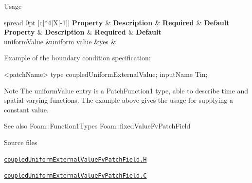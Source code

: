 \label{_Description}%
 \begin{DoxyParagraph}{Usage}
\tabulinesep=1mm
\begin{longtabu} spread 0pt [c]{*{4}{|X[-1]}|}
\hline
\rowcolor{\tableheadbgcolor}\PBS\centering \textbf{ {\bfseries  Property } }&\PBS\centering \textbf{ {\bfseries  Description } }&\PBS\centering \textbf{ {\bfseries  Required } }&\PBS\centering \textbf{ {\bfseries  Default}  }\\
\endfirsthead
\hline
\endfoot
\hline
\rowcolor{\tableheadbgcolor}\PBS\centering \textbf{ {\bfseries  Property } }&\PBS\centering \textbf{ {\bfseries  Description } }&\PBS\centering \textbf{ {\bfseries  Required } }&\PBS\centering \textbf{ {\bfseries  Default}  }\\
\endhead
{\ttfamily uniform\+Value}  &uniform value  &yes  &\\
\end{longtabu}
\begin{DoxyVerb}Example of the boundary condition specification:
\end{DoxyVerb}
 \begin{DoxyVerb}    <patchName>
    {
        type            coupledUniformExternalValue;
        inputName       Tin;
    }\end{DoxyVerb}

\end{DoxyParagraph}
\begin{DoxyNote}{Note}
The uniform\+Value entry is a Patch\+Function1 type, able to describe time and spatial varying functions. The example above gives the usage for supplying a constant value.
\end{DoxyNote}
\begin{DoxySeeAlso}{See also}
Foam\+::\+Function1\+Types Foam\+::fixed\+Value\+Fv\+Patch\+Field
\end{DoxySeeAlso}
\begin{DoxyParagraph}{Source files}

\begin{DoxyItemize}
\item \href{../../../home/carlo/data/GeN-Foam/GeN-Foam_ffn/GeN-Foam/GeN-Foam/FMU4FOAM/ECI4FOAM/src/externalComm/externalIO/input/BC/coupledUniformExternalValue/coupledUniformExternalValueFvPatchField.H}{\tt coupled\+Uniform\+External\+Value\+Fv\+Patch\+Field.\+H} 
\item \href{../../../home/carlo/data/GeN-Foam/GeN-Foam_ffn/GeN-Foam/GeN-Foam/FMU4FOAM/ECI4FOAM/src/externalComm/externalIO/input/BC/coupledUniformExternalValue/coupledUniformExternalValueFvPatchField.C}{\tt coupled\+Uniform\+External\+Value\+Fv\+Patch\+Field.\+C} 
\end{DoxyItemize}
\end{DoxyParagraph}


